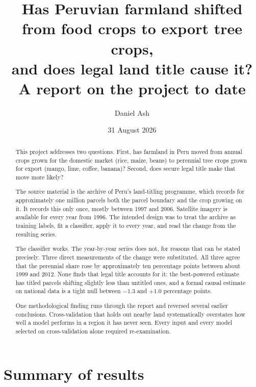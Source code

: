 \documentclass[11pt,a4paper]{article}
\title{\textbf{Has Peruvian farmland shifted from food crops to export tree crops,\\
and does legal land title cause it?}\\[0.6em]
\large A report on the project to date}
\author{Daniel Ash}
\date{31 August 2026}
\begin{document}
\maketitle

\begin{abstract}
\noindent
This project addresses two questions. First, has farmland in Peru moved from annual crops grown
for the domestic market (rice, maize, beans) to perennial tree crops grown for export (mango,
lime, coffee, banana)? Second, does secure legal title make that move more likely?

The source material is the archive of Peru's land-titling programme, which records for
approximately one million parcels both the parcel boundary and the crop growing on it. It
records this only once, mostly between 1997 and 2006. Satellite imagery is available for every
year from 1996. The intended design was to treat the archive as training labels, fit a
classifier, apply it to every year, and read the change from the resulting series.

The classifier works. The year-by-year series does not, for reasons that can be stated
precisely. Three direct measurements of the change were substituted. All three agree that the
perennial share rose by approximately ten percentage points between about 1999 and 2012. None
finds that legal title accounts for it: the best-powered estimate has titled parcels shifting
slightly less than untitled ones, and a formal causal estimate on national data is a tight null
between $-1.3$ and $+1.0$ percentage points.

One methodological finding runs through the report and reversed several earlier conclusions.
Cross-validation that holds out nearby land systematically overstates how well a model performs
in a region it has never seen. Every input and every model selected on cross-validation alone
required re-examination.
\end{abstract}

\tableofcontents
\newpage

\section{Summary of results}
\end{document}
